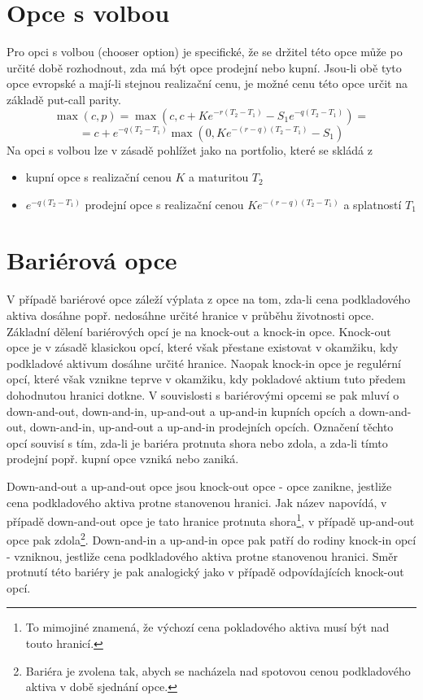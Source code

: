 \documentclass[a4paper]{book}
\begin{document}
\section{Opce s volbou}

Pro opci s volbou (chooser option) je specifické, že se držitel této opce může po určité době rozhodnout, zda má být opce prodejní nebo kupní. Jsou-li obě tyto opce evropské a mají-li stejnou realizační cenu, je možné cenu této opce určit na základě put-call parity.
\begin{equation*}
\max(c,p) = \max(c,c+Ke^{-r(T_2 - T_1)}-S_1e^{-q(T_2 - T_1)})=
\end{equation*}
\begin{equation*}
=c+e^{-q(T_2 - T_1)} \max(0,Ke^{-(r-q)(T_2 - T_1)}-S_1)
\end{equation*}
Na opci s volbou lze v zásadě pohlížet jako na portfolio, které se skládá z
\begin{itemize}
\item kupní opce s realizační cenou $K$ a maturitou $T_2$
\item $e^{-q(T_2 - T_1)}$ prodejní opce s realizační cenou $Ke^{-(r-q)(T_2 - T_1)}$ a splatností $T_1$
\end{itemize}

\section{Bariérová opce}

V případě bariérové opce záleží výplata z opce na tom, zda-li cena podkladového aktiva dosáhne popř. nedosáhne určité hranice v průběhu životnosti opce. Základní dělení bariérových opcí je na knock-out a knock-in opce. Knock-out opce je v zásadě klasickou opcí, které však přestane existovat v okamžiku, kdy podkladové aktivum dosáhne určité hranice. Naopak knock-in opce je regulérní opcí, které však vznikne teprve v okamžiku, kdy pokladové aktium tuto předem dohodnutou hranici dotkne. V souvislosti s bariérovými opcemi se pak mluví o down-and-out, down-and-in, up-and-out a up-and-in kupních opcích a down-and-out, down-and-in, up-and-out a up-and-in prodejních opcích. Označení těchto opcí souvisí s tím, zda-li je bariéra protnuta shora nebo zdola, a zda-li tímto prodejní popř. kupní opce vzniká nebo zaniká.

Down-and-out a up-and-out opce jsou knock-out opce - opce zanikne, jestliže cena podkladového aktiva protne stanovenou hranici. Jak název napovídá, v případě down-and-out opce je tato hranice protnuta shora\footnote{To mimojiné znamená, že výchozí cena pokladového aktiva musí být nad touto hranicí.}, v případě up-and-out opce pak zdola\footnote{Bariéra je zvolena tak, abych se nacházela nad spotovou cenou podkladového aktiva v době sjednání opce.}. Down-and-in a up-and-in opce pak patří do rodiny knock-in opcí - vzniknou, jestliže cena podkladového aktiva protne stanovenou hranici. Směr protnutí této bariéry je pak analogický jako v případě odpovídajících knock-out opcí.
\end{document}
